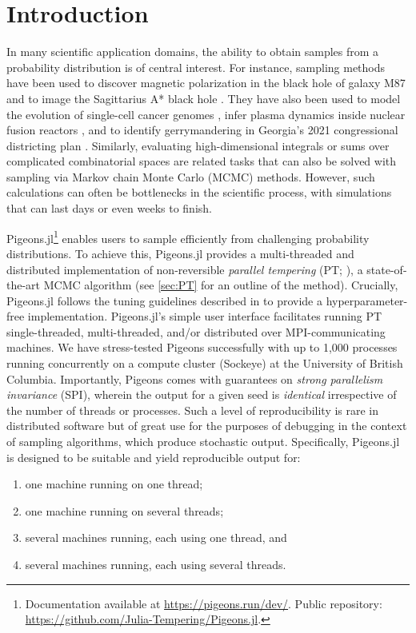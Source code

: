 \section{Introduction}
In many scientific application domains, the ability to obtain samples from a 
probability distribution is of central interest. 
For instance, sampling methods have been used to discover magnetic polarization 
in the black hole of galaxy M87 \cite{akiyama2021seven}
and to image the Sagittarius A* black hole \cite{akiyama2022first}.
They have also been used to 
model the evolution of single-cell cancer genomes \cite{salehi2021clonal}, 
infer plasma dynamics inside nuclear fusion reactors \cite{gota2021overview}, 
and to identify gerrymandering in Georgia's 2021 congressional districting plan 
\cite{zhao2022mathematically}.
Similarly, evaluating high-dimensional integrals or sums over complicated 
combinatorial spaces are related tasks that can also be solved with sampling 
via Markov chain Monte Carlo (MCMC) methods. 
However, such calculations can often be bottlenecks in the scientific process, with 
simulations that can last days or even weeks to finish. 


Pigeons.jl\footnote{Documentation available at \url{https://pigeons.run/dev/}. 
Public repository: \url{https://github.com/Julia-Tempering/Pigeons.jl}.}
enables users to sample efficiently from challenging probability distributions.
To achieve this, Pigeons.jl provides a multi-threaded and distributed implementation
of non-reversible \emph{parallel tempering}
(PT; \citealp{syed2021nrpt,syed2021paths,surjanovic2022vpt,surjanovic2024ergodicity}), 
a state-of-the-art MCMC algorithm (see \cref{sec:PT} for an outline of the method).
Crucially, Pigeons.jl follows the tuning guidelines described in \citet{syed2021nrpt} 
to provide a hyperparameter-free implementation.
Pigeons.jl's simple user interface facilitates running PT
single-threaded, multi-threaded, and/or distributed over MPI-communicating machines. 
We have stress-tested Pigeons successfully with up to 1,000 processes running 
concurrently on a compute cluster (Sockeye) at the University of British Columbia.
Importantly, Pigeons comes with guarantees on \emph{strong parallelism invariance} (SPI), 
wherein the output for a given seed is \emph{identical} irrespective of the number 
of threads or processes. Such a level of reproducibility is rare in distributed 
software but of great use for the purposes of debugging in the context of sampling 
algorithms, which produce stochastic output.
Specifically, Pigeons.jl is designed to be suitable and yield reproducible output for:
\begin{enumerate}
    \item one machine running on one thread;
    \item one machine running on several threads;
    \item several machines running, each using one thread, and
    \item several machines running, each using several threads.
\end{enumerate}


